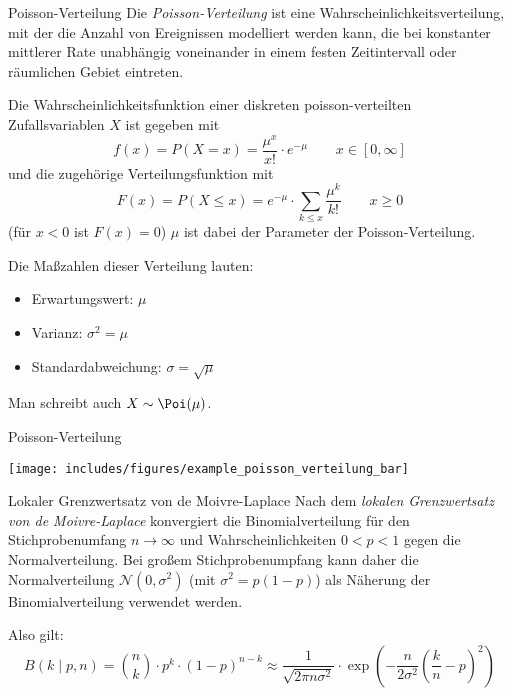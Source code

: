 \begin{defi}{Poisson-Verteilung}
    Die \emph{Poisson-Verteilung} ist eine Wahrscheinlichkeitsverteilung, mit der die Anzahl von Ereignissen modelliert werden kann, die bei konstanter mittlerer Rate unabhängig voneinander in einem festen Zeitintervall oder räumlichen Gebiet eintreten.

    Die Wahrscheinlichkeitsfunktion einer diskreten poisson-verteilten Zufallsvariablen $X$ ist gegeben mit
    \[
        f(x) = P(X = x) = \frac{\mu^x}{x!} \cdot e^{-\mu} \qquad x \in [0,\infty]
    \]
    und die zugehörige Verteilungsfunktion mit
    \[
        F(x) = P(X \leq x) = e^{-\mu} \cdot \sum_{k \leq x} \frac{\mu^k}{k!} \qquad x \geq 0
    \]
    (für $x < 0$ ist $F(x) = 0$) $\mu$ ist dabei der Parameter der Poisson-Verteilung.

    Die Maßzahlen dieser Verteilung lauten:
    \begin{itemize}
        \item Erwartungswert: $\mu$
        \item Varianz: $\sigma^2 = \mu$
        \item Standardabweichung: $\sigma = \sqrt{\mu}$
    \end{itemize}

    Man schreibt auch $X \sim \Poi(\mu)$.
\end{defi}

\begin{example}{Poisson-Verteilung}
    \begin{center}
        \texttt{[image: includes/figures/example\_poisson\_verteilung\_bar]}
    \end{center}
\end{example}

\begin{defi}{Lokaler Grenzwertsatz von de Moivre-Laplace}
    Nach dem \emph{lokalen Grenzwertsatz von de Moivre-Laplace} konvergiert die Binomialverteilung für den Stichprobenumfang $n \to \infty$ und Wahrscheinlichkeiten $0 < p < 1$ gegen die Normalverteilung.
    Bei großem Stichprobenumpfang kann daher die Normalverteilung $\mathcal{N}(0, \sigma^2)$ (mit $\sigma^2 = p(1-p)$) als Näherung der Binomialverteilung verwendet werden.

    Also gilt:
    \[
        B(k \mid p, n) = \binom{n}{k} \cdot p^k \cdot (1-p)^{n-k} \approx \frac{1}{\sqrt{2\pi n \sigma^2}} \cdot \exp \left( -\frac{n}{2\sigma^2} \left( \frac{k}{n} - p \right)^2 \right)
    \]
\end{defi}

